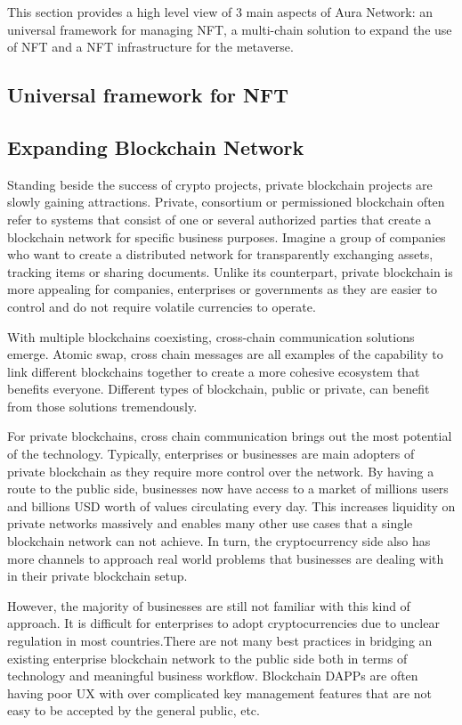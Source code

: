 \documentclass[12pt]{article}
\begin{document}
This section provides a high level view of 3 main aspects of Aura Network: an universal framework for managing NFT, a multi-chain solution to expand the use of NFT and a NFT infrastructure for the metaverse.

\subsection{Universal framework for NFT}


\subsection{Expanding Blockchain Network}
Standing beside the success of crypto projects, private blockchain projects are slowly gaining attractions. Private, consortium or permissioned blockchain often refer to systems that consist of one or several authorized parties that create a blockchain network for specific business purposes. Imagine a group of companies who want to create a distributed network for transparently exchanging assets, tracking items or sharing documents. Unlike its counterpart, private blockchain is more appealing for companies, enterprises or governments as they are easier to control and do not require volatile currencies to operate.

With multiple blockchains coexisting, cross-chain communication solutions emerge. Atomic swap, cross chain messages are all examples of the capability to link different blockchains together to create a more cohesive ecosystem that benefits everyone. Different types of blockchain, public or private, can benefit from those solutions tremendously. 

For private blockchains, cross chain communication brings out the most potential of the technology. Typically, enterprises or businesses are main adopters of private blockchain as they  require more control over the network. By having a route to the public side, businesses now have access to a market of millions users and billions USD worth of values circulating every day. This increases liquidity on private networks massively and enables many other use cases that a single blockchain network can not achieve. In turn, the cryptocurrency side also has more channels to approach real world problems that businesses are dealing with in their private blockchain setup. 

However, the majority of businesses are still not familiar with this kind of approach. It is difficult for enterprises to adopt cryptocurrencies due to unclear regulation in most countries.There are not many best practices in bridging an existing enterprise blockchain network to the public side both in terms of technology and meaningful business workflow. Blockchain DAPPs are often having poor UX with over complicated key management features that are not easy to be accepted by the general public, etc. 
\end{document}
